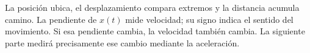\documentclass[11pt]{article}
\begin{document}
\begin{center}
\end{center}

La posición ubica, el desplazamiento compara extremos y la distancia acumula
camino. La pendiente de \(x(t)\) mide velocidad; su signo indica el sentido del
movimiento. Si esa pendiente cambia, la velocidad también cambia. La siguiente
parte medirá precisamente ese cambio mediante la aceleración.
\end{document}
